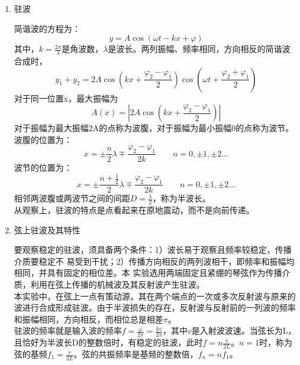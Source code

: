 \documentclass[11pt]{article}
\begin{document}
\begin{enumerate}
    \item 驻波
    \par 简谐波的方程为：
    \begin{equation}
        y=A\cos\left(\omega t-kx+\varphi\right)
    \end{equation}
    其中，$k=\frac{2\pi}{\lambda}$是角波数，$\lambda$是波长。两列振幅、频率相同，方向相反的简谐波合成时，
    \begin{equation}
        y_1+y_2=2A\cos\left(kx+\frac{\varphi_2-\varphi_1}{2}\right)\cos\left(\omega t+\frac{\varphi_2+\varphi_1}{2}\right)
    \end{equation}
    对于同一位置x，最大振幅为
    \begin{equation}
        A(x)=\left|2A\cos\left(kx+\frac{\varphi_2-\varphi_1}{2}\right)\right|
    \end{equation}
    对于振幅为最大振幅2A的点称为波腹，对于振幅为最小振幅0的点称为波节。
    \\波腹的位置为：
    \begin{equation}
        x=\pm\frac{n}{2}\lambda \mp\frac{\varphi_2-\varphi_1}{2k}\qquad n=0,\pm1,\pm2...
    \end{equation}
    波节的位置为：
    \begin{equation}
        x=\pm\frac{n+\frac{1}{2}}{2}\lambda \mp\frac{\varphi_2-\varphi_1}{2k}\qquad n=0,\pm1,\pm2...
    \end{equation}
    相邻两波腹或两波节之间的间距$D=\frac{\lambda}{2}$，称为半波长。
    \\从观察上，驻波的特点是点看起来在原地震动，而不是向前传递。
    \item 弦上驻波及其特性
    \par \hspace*{2em}要观察稳定的驻波，须具备两个条件：1）波长易于观察且频率较稳定，传播介质要稳定不
    易受到干扰；2）传播方向相反的两列波相干，即频率和振幅均相同，并具有固定的相位差。本
    实验选用两端固定且紧绷的琴弦作为传播介质，利用在弦上传播的机械波及其反射波产生驻波。
    \\\hspace*{2em}本实验中，在弦上一点有策动源，其在两个端点的一次或多次反射波与原来的波进行合成形成驻波。由于半波损失的存在，反射波与反射前的一列波的频率和振幅相同，方向相反，而相位总是相差$\pi$。
    \\\hspace*{2em}驻波的频率就是输入波的频率$f=\frac{\omega}{2\pi}=\frac{kv}{2\pi}$，其中$v$是入射波波速。当弦长为L，且恰好为半波长D的整数倍时，有稳定的驻波，此时$f=n\frac{v}{2L}$。$n=1$时，称为弦的基频$f_1=\frac{v}{2L}$。弦的共振频率是基频的整数倍，$f_n=nf_1$。

\end{enumerate}
\end{document}
